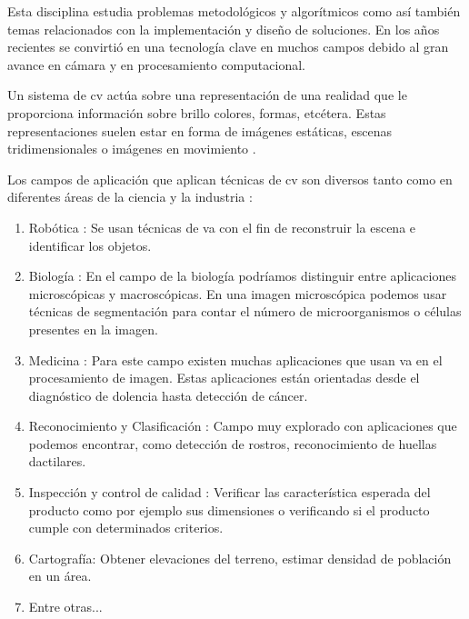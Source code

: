 Esta disciplina estudia problemas metodológicos y algorítmicos como así también temas relacionados con la implementación y diseño de soluciones. En los años recientes se convirtió en una tecnología clave en muchos campos debido al gran avance en cámara y en procesamiento computacional.

Un sistema de \ac{cv} actúa sobre una representación de una realidad que le proporciona información sobre brillo colores, formas, etcétera. Estas representaciones suelen estar en forma de imágenes estáticas, escenas tridimensionales o imágenes en movimiento \citep{Ledda}. 


Los campos de aplicación que aplican técnicas de \ac{cv} son diversos tanto como en diferentes áreas de la ciencia y la industria \citep{areascv} :
\begin{enumerate}
\item Robótica : Se usan técnicas de \ac{va} con el fin de reconstruir la escena e identificar los objetos.
\item Biología : En el campo de la biología podríamos distinguir entre aplicaciones microscópicas y macroscópicas. En una imagen microscópica  podemos  usar técnicas de segmentación para contar el número de microorganismos o células presentes en la imagen.
\item Medicina : Para este campo existen muchas aplicaciones que usan \ac{va} en el procesamiento de imagen. Estas aplicaciones están orientadas desde el diagnóstico de dolencia hasta detección de cáncer. 
\item  Reconocimiento y Clasificación : Campo muy explorado con aplicaciones que podemos encontrar, como detección de rostros, reconocimiento de huellas dactilares.
\item Inspección y control de calidad : Verificar las característica esperada del producto como por ejemplo sus dimensiones o verificando si el producto cumple con determinados criterios.
\item  Cartografía: Obtener elevaciones del terreno, estimar densidad de población en un área.
\item Entre otras...
\end{enumerate}

